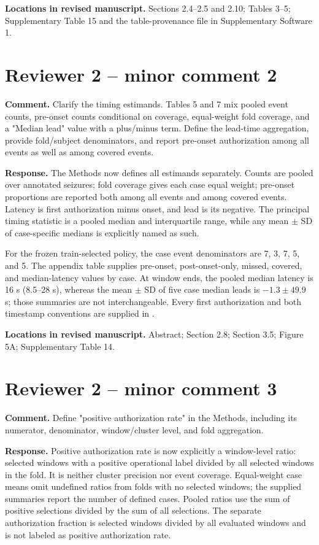 \documentclass[11pt,a4paper]{article}
\begin{document}
\textbf{Locations in revised manuscript.} Sections 2.4--2.5 and 2.10; Tables 3--5; Supplementary Table 15 and the table-provenance file in Supplementary Software 1.

\section*{Reviewer 2 -- minor comment 2}

\textbf{Comment.} Clarify the timing estimands. Tables 5 and 7 mix pooled event counts, pre-onset counts conditional on coverage, equal-weight fold coverage, and a "Median lead" value with a plus/minus term. Define the lead-time aggregation, provide fold/subject denominators, and report pre-onset authorization among all events as well as among covered events.

\textbf{Response.} The Methods now defines all estimands separately. Counts are pooled over annotated seizures; fold coverage gives each case equal weight; pre-onset proportions are reported both among all events and among covered events. Latency is first authorization minus onset, and lead is its negative. The principal timing statistic is a pooled median and interquartile range, while any mean $\pm$ SD of case-specific medians is explicitly named as such.

For the frozen train-selected policy, the case event denominators are 7, 3, 7, 5, and 5. The appendix table supplies pre-onset, post-onset-only, missed, covered, and median-latency values by case. At window ends, the pooled median latency is 16 s (8.5--28 s), whereas the mean $\pm$ SD of five case median leads is $-1.3\pm49.9$ s; those summaries are not interchangeable. Every first authorization and both timestamp conventions are supplied in .

\textbf{Locations in revised manuscript.} Abstract; Section 2.8; Section 3.5; Figure 5A; Supplementary Table 14.

\section*{Reviewer 2 -- minor comment 3}

\textbf{Comment.} Define "positive authorization rate" in the Methods, including its numerator, denominator, window/cluster level, and fold aggregation.

\textbf{Response.} Positive authorization rate is now explicitly a window-level ratio: selected windows with a positive operational label divided by all selected windows in the fold. It is neither cluster precision nor event coverage. Equal-weight case means omit undefined ratios from folds with no selected windows; the supplied summaries report the number of defined cases. Pooled ratios use the sum of positive selections divided by the sum of all selections. The separate authorization fraction is selected windows divided by all evaluated windows and is not labeled as positive authorization rate.
\end{document}
